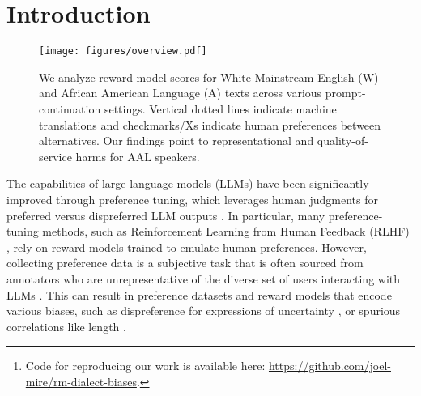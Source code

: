 \begin{abstract}
Preference alignment via reward models helps build safe, helpful, and reliable large language models (LLMs).
However, subjectivity in preference judgments and the lack of representative sampling in preference data collection can introduce new biases, hindering reward models' fairness and equity.
In this work, we introduce a framework for evaluating dialect biases in reward models and conduct a case study on biases against African American Language (AAL) through several experiments comparing reward model preferences and behavior on paired White Mainstream English (WME) and both machine-translated and human-written AAL corpora.
We show that reward models are less aligned with human preferences when processing AAL texts vs. WME ones (-4\% accuracy on average), frequently disprefer AAL-aligned texts vs. WME-aligned ones, and steer conversations toward WME, even when prompted with AAL texts.
Our findings provide a targeted analysis of anti-AAL biases at a relatively understudied stage in LLM development, highlighting representational harms and ethical questions about the desired behavior of LLMs concerning AAL.\footnote{Code for reproducing our work is available here: \url{https://github.com/joel-mire/rm-dialect-biases}.}
\end{abstract}

\section{Introduction}
\begin{figure}[t]
    \centering
    \texttt{[image: figures/overview.pdf]}
    \caption{We analyze reward model scores for White Mainstream English (W) and African American Language (A) texts across various prompt-continuation settings. Vertical dotted lines indicate machine translations and checkmarks/Xs indicate human preferences between alternatives. Our findings point to representational and quality-of-service harms for AAL speakers.}
    \label{fig:overview}
\end{figure}

The capabilities of large language models (LLMs) have been significantly improved through preference tuning, which leverages human judgments for preferred versus dispreferred LLM outputs \cite{ouyang_training_2022}. 
In particular, many preference-tuning methods, such as Reinforcement Learning from Human Feedback (RLHF) \cite{christiano_deep_2017}, rely on reward models trained to emulate human preferences.
However, collecting preference data is a subjective task that is often sourced from annotators who are unrepresentative of the diverse set of users interacting with LLMs \cite{kirk_past_2023, casper_open_2023}. This can result in preference datasets and reward models that encode various biases, such as dispreference for expressions of uncertainty \citep{zhou2024relying}, or spurious correlations like length \cite{singhal_long_2023}.

